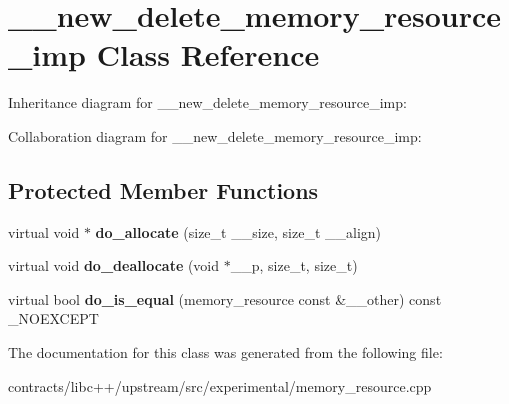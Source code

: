 \hypertarget{class____new__delete__memory__resource__imp}{}\section{\+\_\+\+\_\+new\+\_\+delete\+\_\+memory\+\_\+resource\+\_\+imp Class Reference}
\label{class____new__delete__memory__resource__imp}


Inheritance diagram for \+\_\+\+\_\+new\+\_\+delete\+\_\+memory\+\_\+resource\+\_\+imp\+:


Collaboration diagram for \+\_\+\+\_\+new\+\_\+delete\+\_\+memory\+\_\+resource\+\_\+imp\+:
\subsection*{Protected Member Functions}
\begin{DoxyCompactItemize}
\item 
\mbox{\label{class____new__delete__memory__resource__imp_a77af250e37680d8e7a619490eb6eca1d}} 
virtual void $\ast$ {\bfseries do\+\_\+allocate} (size\+\_\+t \+\_\+\+\_\+size, size\+\_\+t \+\_\+\+\_\+align)
\item 
\mbox{\label{class____new__delete__memory__resource__imp_ac27c47893a77d1d686d996f4b1a96ce5}} 
virtual void {\bfseries do\+\_\+deallocate} (void $\ast$\+\_\+\+\_\+p, size\+\_\+t, size\+\_\+t)
\item 
\mbox{\label{class____new__delete__memory__resource__imp_aa14f18fbda92ca673736628ab380ebed}} 
virtual bool {\bfseries do\+\_\+is\+\_\+equal} (memory\+\_\+resource const \&\+\_\+\+\_\+other) const \+\_\+\+N\+O\+E\+X\+C\+E\+PT
\end{DoxyCompactItemize}


The documentation for this class was generated from the following file\+:\begin{DoxyCompactItemize}
\item 
contracts/libc++/upstream/src/experimental/memory\+\_\+resource.\+cpp\end{DoxyCompactItemize}
